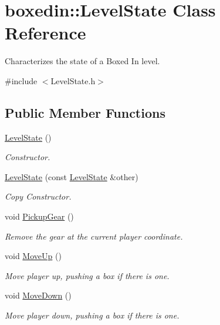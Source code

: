 \hypertarget{classboxedin_1_1LevelState}{\section{boxedin\+:\+:Level\+State Class Reference}
\label{classboxedin_1_1LevelState}
}


Characterizes the state of a Boxed In level.  




{\ttfamily \#include $<$Level\+State.\+h$>$}

\subsection*{Public Member Functions}
\begin{DoxyCompactItemize}
\item 
\hyperlink{classboxedin_1_1LevelState_aba5675b4bb9070d74530f2ca9a8f7abc}{Level\+State} ()
\begin{DoxyCompactList}\small\item\em Constructor. \end{DoxyCompactList}\item 
\hyperlink{classboxedin_1_1LevelState_ad0222f236c59908a2d54e569296278ba}{Level\+State} (const \hyperlink{classboxedin_1_1LevelState}{Level\+State} \&other)
\begin{DoxyCompactList}\small\item\em Copy Constructor. \end{DoxyCompactList}\item 
void \hyperlink{classboxedin_1_1LevelState_a7c048d53cc9a1152c017c0494095a362}{Pickup\+Gear} ()
\begin{DoxyCompactList}\small\item\em Remove the gear at the current player coordinate. \end{DoxyCompactList}\item 
void \hyperlink{classboxedin_1_1LevelState_ae45f5fb187e4b3a0e0417d9fb6cdaaaa}{Move\+Up} ()
\begin{DoxyCompactList}\small\item\em Move player up, pushing a box if there is one. \end{DoxyCompactList}\item 
void \hyperlink{classboxedin_1_1LevelState_ad2f37cbae5ea4d1879f71b9c7e5b23d9}{Move\+Down} ()
\begin{DoxyCompactList}\small\item\em Move player down, pushing a box if there is one. \end{DoxyCompactList}\item 

\end{DoxyCompactItemize}
